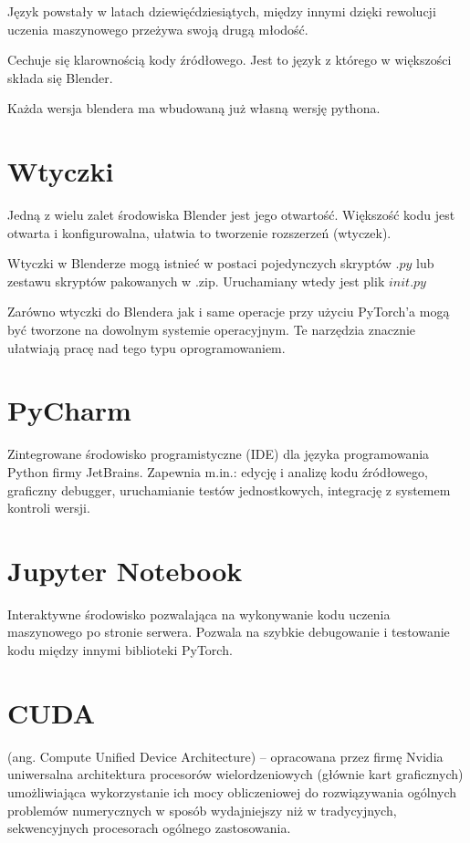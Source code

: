 \documentclass[brudnopis]{xmgr}
\begin{document}
Język powstały w latach dziewięćdziesiątych, między innymi dzięki rewolucji uczenia maszynowego przeżywa swoją drugą młodość.

Cechuje się klarownością kody źródłowego.
Jest to język z którego w większości składa się Blender.

Każda wersja blendera ma wbudowaną już własną wersję pythona. 

\section{Wtyczki\label{s:dsssl}}

Jedną z wielu zalet środowiska Blender jest jego otwartość. Większość kodu jest otwarta i konfigurowalna, ułatwia to tworzenie rozszerzeń (wtyczek).



Wtyczki w Blenderze mogą istnieć w postaci pojedynczych skryptów 
$.py$ lub zestawu skryptów pakowanych w .zip. Uruchamiany wtedy jest plik $init.py$

Zarówno wtyczki do Blendera jak i same operacje przy użyciu PyTorch’a mogą być tworzone na dowolnym systemie operacyjnym. Te narzędzia znacznie ułatwiają pracę nad tego typu oprogramowaniem.

\section{PyCharm\label{s:dsssl}}
 Zintegrowane środowisko programistyczne (IDE) dla języka programowania Python firmy JetBrains. Zapewnia m.in.: edycję i analizę kodu źródłowego, graficzny debugger, uruchamianie testów jednostkowych, integrację z systemem kontroli wersji.
 
 \section{Jupyter Notebook\label{s:dsssl}}
 
 Interaktywne środowisko pozwalająca na wykonywanie kodu uczenia maszynowego po stronie serwera. Pozwala na szybkie debugowanie i testowanie kodu między innymi biblioteki PyTorch.

 \section{CUDA\label{s:dsssl}}
 
 (ang. Compute Unified Device Architecture) – opracowana przez firmę Nvidia uniwersalna architektura procesorów wielordzeniowych (głównie kart graficznych) umożliwiająca wykorzystanie ich mocy obliczeniowej do rozwiązywania ogólnych problemów numerycznych w sposób wydajniejszy niż w tradycyjnych, sekwencyjnych procesorach ogólnego zastosowania.
\end{document}
